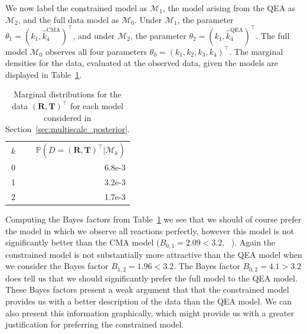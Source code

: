 \documentclass[final]{siamltex}
\begin{document}
We now label the constrained model as $\mathcal{M}_1$, the model arising from the QEA as $\mathcal{M}_2$, and the full data model as $\mathcal{M}_0$. Under $\mathcal{M}_1$, the parameter $\theta_1 = (k_1, \hat{k}_4^{\text{CMA}})^\top$, and under $\mathcal{M}_2$, the parameter $\theta_2 = (k_1, \hat{k}_4^{\text{QEA}})^\top$. The full model $\mathcal{M}_0$ observes all four parameters $\theta_0 = (k_1, k_2, k_3, k_4)^\top$. The marginal densities for the data, evaluated at the observed data, given the models are displayed in Table~\ref{tab:chem_Bayes_marginals}.

\begin{table}[!htb]
\centering
\begin{tabular}{rr}
	\toprule
	$k$ & \quad $\mathbb{P}(D = (\mathbf{R},\mathbf{T})^\top|\mathcal{M}_k)$ \\ \cmidrule(lr){1-2}
	0 & 6.8e-3 \\
	1 & 3.2e-3 \\
	2 & 1.7e-3 \\ \bottomrule
\end{tabular}
\caption{Marginal distributions for the data $(\mathbf{R},\mathbf{T})^\top$ for each model considered in Section~\ref{sec:multiscale_posterior}.}
\label{tab:chem_Bayes_marginals}
\end{table}

Computing the Bayes factors from Table~\ref{tab:chem_Bayes_marginals} we see that we should of course prefer the model in which we observe all reactions perfectly, however this model is not significantly better than the CMA model ($B_{0,1} = 2.09 < 3.2$, ~\cite{kass1995bayes}). Again the constrained model is not substantially more attractive than the QEA model when we consider the Bayes factor $B_{1,2} = 1.96 < 3.2$. The Bayes factor $B_{0,2} = 4.1 > 3.2$ does tell us that we should significantly prefer the full model to the QEA model. These Bayes factors present a weak argument that that the constrained model provides us with a better description of the data than the QEA model. We can also present this information graphically, which might provide us with a greater justification for preferring the constrained model.
\end{document}
